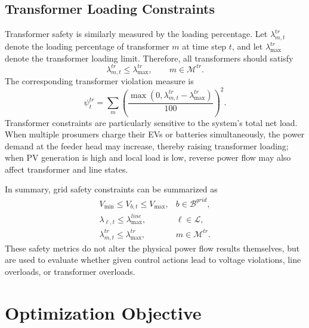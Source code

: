 \subsection{Transformer Loading Constraints}

Transformer safety is similarly measured by the loading percentage. Let \(\lambda^{tr}_{m,t}\) denote the loading percentage of transformer \(m\) at time step \(t\), and let \(\lambda^{tr}_{\max}\) denote the transformer loading limit. Therefore, all transformers should satisfy
\[
  \lambda^{tr}_{m,t}\le \lambda^{tr}_{\max},
  \qquad m\in\mathcal{M}^{tr}.
\]
The corresponding transformer violation measure is
\[
  \psi^{tr}_t
  =
  \sum_m
  \left(
  \frac{\max(0,\lambda^{tr}_{m,t}-\lambda^{tr}_{\max})}{100}
  \right)^2.
\]
Transformer constraints are particularly sensitive to the system's total net load. When multiple prosumers charge their EVs or batteries simultaneously, the power demand at the feeder head may increase, thereby raising transformer loading; when PV generation is high and local load is low, reverse power flow may also affect transformer and line states.

In summary, grid safety constraints can be summarized as
\[
\begin{array}{ll}
V_{\min}\le V_{b,t}\le V_{\max}, & b\in\mathcal{B}^{grid},\\[1mm]
\lambda_{\ell,t}\le \lambda^{line}_{\max}, & \ell\in\mathcal{L},\\[1mm]
\lambda^{tr}_{m,t}\le \lambda^{tr}_{\max}, & m\in\mathcal{M}^{tr}.
\end{array}
\]
These safety metrics do not alter the physical power flow results themselves, but are used to evaluate whether given control actions lead to voltage violations, line overloads, or transformer overloads. 

\section{Optimization Objective}

